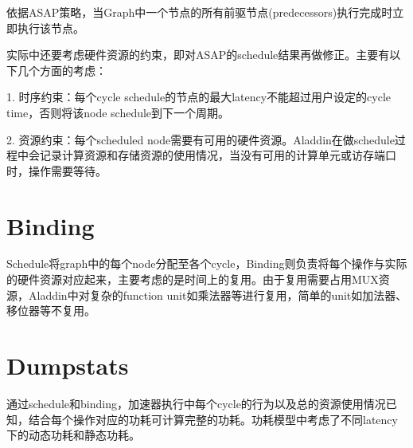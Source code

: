 \documentclass[UTF8]{scrartcl}
\begin{document}
	依据ASAP策略，当Graph中一个节点的所有前驱节点(predecessors)执行完成时立即执行该节点。
		
	实际中还要考虑硬件资源的约束，即对ASAP的schedule结果再做修正。主要有以下几个方面的考虑：
		
	1.  时序约束：每个cycle schedule的节点的最大latency不能超过用户设定的cycle time，否则将该node schedule到下一个周期。
	
	2.  资源约束：每个scheduled node需要有可用的硬件资源。Aladdin在做schedule过程中会记录计算资源和存储资源的使用情况，当没有可用的计算单元或访存端口时，操作需要等待。

\section{Binding}
	
	Schedule将graph中的每个node分配至各个cycle，Binding则负责将每个操作与实际的硬件资源对应起来，主要考虑的是时间上的复用。由于复用需要占用MUX资源，Aladdin中对复杂的function unit如乘法器等进行复用，简单的unit如加法器、移位器等不复用。

\section{Dumpstats}
	
	通过schedule和binding，加速器执行中每个cycle的行为以及总的资源使用情况已知，结合每个操作对应的功耗可计算完整的功耗。功耗模型中考虑了不同latency下的动态功耗和静态功耗。
			
\end{document}
